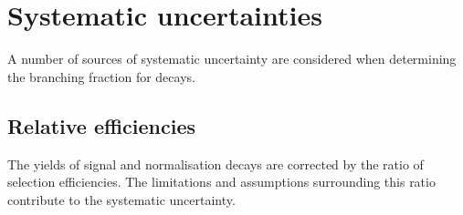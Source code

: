 \section{Systematic uncertainties}
\label{sec:B2DsKK_systuncertainy}


A number of sources of systematic uncertainty are considered when determining the branching fraction for \decay{\Bp}{\Dsp\Kp\Km} decays.



\subsection{Relative efficiencies}
\label{sec:B2DsKK_sys_releff}

The yields of signal and normalisation decays are corrected by the ratio of selection efficiencies. The limitations and assumptions surrounding this ratio contribute to the systematic uncertainty.

